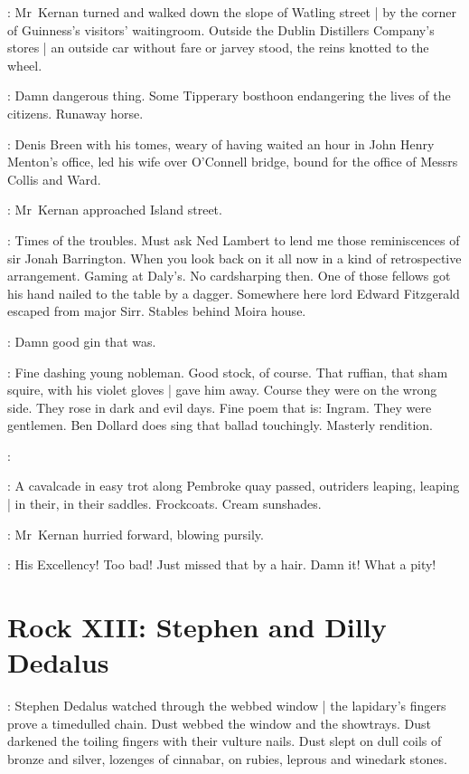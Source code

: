 :
Mr~Kernan turned and walked down the slope of Watling street |
by the corner of Guinness's visitors' waitingroom.
Outside the Dublin Distillers Company's stores |
an outside car without fare or jarvey stood,
the reins knotted to the wheel.

:
Damn dangerous thing.
Some Tipperary bosthoon
endangering the lives of the citizens.
Runaway horse.

\begin{interject}
    :
    Denis Breen with his tomes,
    weary of having waited an hour in John Henry Menton's office,
    led his wife over O'Connell bridge,
    bound for the office
    of Messrs Collis and Ward.
\end{interject}%

:
Mr~Kernan approached Island street.

:
Times of the troubles.
Must ask Ned Lambert to lend me
those reminiscences of sir Jonah Barrington.
When you look back on it all now
in a kind of retrospective arrangement.
Gaming at Daly's.
No cardsharping then.
One of those fellows got his hand nailed to the table by a dagger.
Somewhere here lord Edward Fitzgerald escaped from major Sirr.
Stables behind Moira house.

:
Damn good gin that was.

:
Fine dashing young nobleman.
Good stock, of course.
That ruffian, that sham squire, with his violet gloves |
gave him away.
Course they were on the wrong side.%
They rose in dark and evil days.
Fine poem that is:
Ingram.
They were gentlemen.
Ben Dollard does sing that ballad touchingly.
Masterly rendition.

:

:
A cavalcade in easy trot along Pembroke quay passed,
outriders leaping, leaping |
in their, in their saddles.
Frockcoats.
Cream sunshades.

:
Mr~Kernan hurried forward,
blowing pursily.

:
His Excellency!
Too bad!
Just missed that by a hair.
Damn it!
What a pity!


\section*{Rock XIII: Stephen and Dilly Dedalus}


:
Stephen Dedalus watched through the webbed window |
the lapidary's fingers prove a timedulled chain.
Dust webbed the window and the showtrays.
Dust darkened the toiling fingers with their vulture nails.
Dust slept on dull coils of bronze and silver,
lozenges of cinnabar,
on rubies,
leprous and winedark stones.


